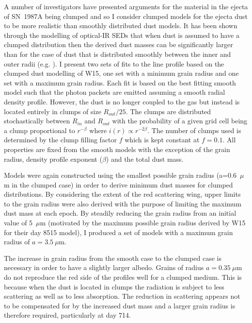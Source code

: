 A number of investigators have presented arguments for the material in the 
ejecta of SN~1987A being clumped \citep{Lucy1991,Li1992,Kozma1998b} and so 
I consider clumped models for the ejecta dust to be more realistic than 
smoothly distributed dust models. It has been shown through the modelling 
of optical-IR SEDs that when dust is assumed to have a clumped 
distribution then the derived dust masses can be significantly larger than 
for the case of dust that is distributed smoothly between the inner and 
outer radii (e.g. \citet{Ercolano2007,Owen2015}). I present two sets of 
fits to the line profile based on the clumped dust modelling of W15, one 
set with a minimum grain radius and one set with a maximum grain radius.  
Each fit is based on the best fitting smooth model such that the photon 
packets are emitted assuming a smooth radial density profile.  However, 
the dust is no longer coupled to the gas but instead is located entirely 
in clumps of size $R_{out}/25$.  The clumps are distributed stochastically 
between $R_{in}$ and $R_{out}$ with the probability of a given grid cell 
being a clump proportional to $r^{- \beta }$ where $i(r) \propto r^{-2 
\beta}$.  The number of clumps used is determined by the clump filling 
factor $f$ which is kept constant at $f=0.1$.  All properties are fixed 
from the smooth models with the exception of the grain radius, density 
profile exponent ($\beta$) and the total dust mass.

Models were again constructed using the smallest possible grain radius (a=0.6~$\mu$m in the clumped case) in order to derive minimum dust masses 
for clumped distributions.  By considering the extent of the red 
scattering wing, upper limits to the grain radius were also derived with the 
purpose of limiting the maximum dust mass at each epoch.  By steadily 
reducing the grain radius from an initial value of 5~$\mu$m (motivated by 
the maximum possible grain radius derived by W15 for their day 8515 model), 
I produced a set of models with a maximum grain radius of $a=3.5~\mu$m.  



The increase in grain radius from the smooth case to the clumped case is 
necessary in order to have a slightly larger albedo.  Grains of radius 
$a=0.35~\mu$m do not reproduce the red side of the profiles well for a 
clumped medium.  This is because when the dust is located in clumps the 
radiation is subject to less scattering as well as to less absorption.  
The reduction in scattering appears not to be compensated for by the 
increased dust mass and a larger grain radius is therefore required, 
particularly at day 714.

